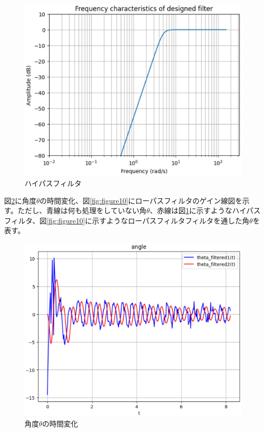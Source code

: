 \documentclass[a4paper,10.5pt]{ltjsarticle}
\begin{document}
\begin{figure}[h]
  \centering
  \includegraphics[scale=0.7]{figure8.eps}
  \caption{ハイパスフィルタ}
  \label{fig:figure8}
\end{figure}
\clearpage
図\ref{fig:figure9}に角度$\theta$の時間変化、図\ref{fig:figure10}にローパスフィルタのゲイン線図を示す。ただし、青線は何も処理をしていない角$\theta$、赤線は図\ref{fig:figure8}に示すようなハイパスフィルタ、図\ref{fig:figure10}に示すようなローパスフィルタフィルタを通した角$\theta$を表す。
\begin{figure}[h]
  \centering
  \includegraphics[scale=0.7]{figure9.eps}
  \caption{角度$\theta$の時間変化}
  \label{fig:figure9}
\end{figure}
\end{document}
